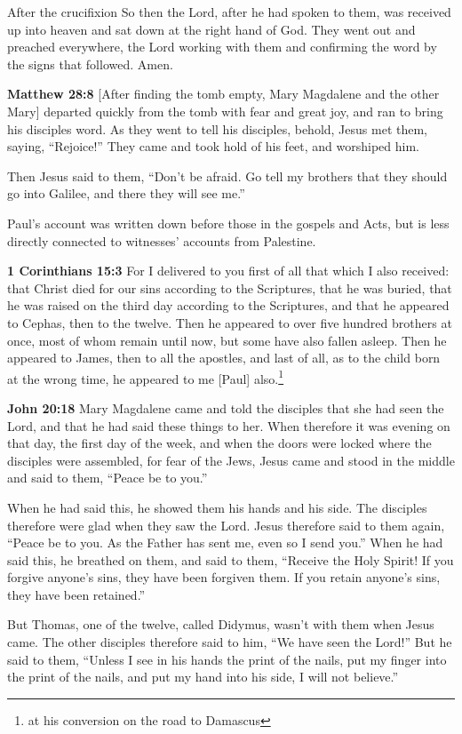 \documentclass[10pt,twoside]{article} %
\newcommand{\quotesize}{\normalsize{}}
\newcommand{\comm}[1]{\begingroup \color{black!50} #1\endgroup}
\newenvironment{quotetext}{\begingroup\quotesize}{\endgroup}
\newcommand{\bible}[2]{\begin{quotetext}\textbf{#1} #2\end{quotetext}}
\newcommand{\matthew}[2]{\bible{Matthew #1}{#2}}
\newcommand{\john}[2]{\bible{John #1}{#2}}
\begin{document}
\begin{section}{After the crucifixion}
{  So then the Lord, after he had spoken to them, was received up into heaven and sat down at the right hand of God.   They went out and preached everywhere, the Lord working with them and confirming the word by the signs that followed. Amen.
}

\matthew{28:8}{
 [After finding the tomb empty, Mary Magdalene and the other Mary] departed quickly from the tomb with fear and great joy, and ran to bring his disciples word.   As they went to tell his disciples, behold, Jesus met them, saying, ``Rejoice!''
They came and took hold of his feet, and worshiped him.

  Then Jesus said to them, ``Don't be afraid. Go tell my brothers  that they should go into Galilee, and there they will see me.'' 
}

\comm{Paul's account was written down before those in the gospels and Acts, but is less directly connected to witnesses' accounts from Palestine.}

\bible{1 Corinthians 15:3}{
For I delivered to you first of all that which I also received: that Christ died for our sins according to the Scriptures,   that he was buried, that he was raised on the third day according to the Scriptures,   and that he appeared to Cephas, then to the twelve.   Then he appeared to over five hundred brothers at once, most of whom remain until now, but some have also fallen asleep.   Then he appeared to James, then to all the apostles,   and last of all, as to the child born at the wrong time, he appeared to me [Paul] also.\footnote{at his conversion on the road to Damascus}
}

\john{20:18}{
Mary Magdalene came and told the disciples that she had seen the Lord, and that he had said these things to her.   When therefore it was evening on that day, the first day of the week, and when the doors were locked where the disciples were assembled, for fear of the Jews, Jesus came and stood in the middle and said to them, ``Peace be to you.''

  When he had said this, he showed them his hands and his side. The disciples therefore were glad when they saw the Lord.   Jesus therefore said to them again, ``Peace be to you. As the Father has sent me, even so I send you.''   When he had said this, he breathed on them, and said to them, ``Receive the Holy Spirit!    If you forgive anyone's sins, they have been forgiven them. If you retain anyone's sins, they have been retained.''

  But Thomas, one of the twelve, called Didymus, wasn't with them when Jesus came.   The other disciples therefore said to him, ``We have seen the Lord!''
But he said to them, ``Unless I see in his hands the print of the nails, put my finger into the print of the nails, and put my hand into his side, I will not believe.''

}
\end{section}
\end{document}
